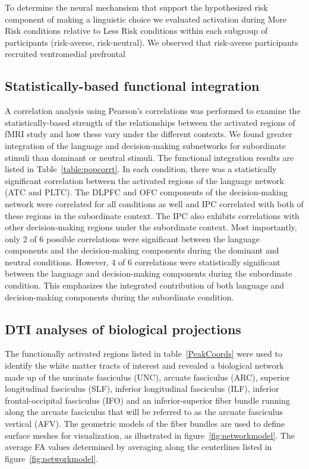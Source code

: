 \documentclass[final,authoryear,5p,times,twocolumn]{elsarticle}
\begin{document}
To determine the neural mechansism that support the hypothesized risk component of making a linguistic choice we evaluated activation during More Risk conditions relative to Less Risk conditions within each subgroup of participants (risk-averse, risk-neutral).  We observed that risk-averse participants recruited ventromedial prefrontal

\subsection{Statistically-based functional integration}
A correlation analysis using Pearson's correlations was performed to examine the statistically-based strength of the relationships between the activated regions of fMRI study and how these vary under the different contexts. We found greater integration of the language and decision-making subnetworks for subordinate stimuli than dominant or neutral stimuli. The functional integration results are listed in Table~\ref{table:popcorrt}. In each condition, there was a statistically significant correlation between the activated regions of the language network (ATC and PLTC). The DLPFC and OFC components of the decision-making network were correlated for all conditions as well and IPC correlated with both of these regions in the subordinate context. The IPC also exhibits correlations with other decision-making regions under the subordinate context. Most importantly, only 2 of 6 possible correlations were significant between the language components and the decision-making components during the dominant and neutral conditions. However, 4 of 6 correlations were statistically significant between the language and decision-making components during the subordinate condition. This emphasizes the integrated contribution of both language and decision-making components during the subordinate condition. 

\subsection{DTI analyses of biological projections}
The functionally activated regions listed in table~\ref{PeakCoords} were used to identify the white matter tracts of interest and revealed a biological network made up of the uncinate fasciculus (UNC), arcuate fasciculus (ARC), superior longitudinal fasciculus (SLF), inferior longitudinal fasciculus (ILF), inferior frontal-occipital fasciculus (IFO) and an inferior-superior fiber bundle running along the arcuate fasciculus that will be referred to as the arcuate fasciculus vertical (AFV). The geometric models of the fiber bundles are used to define surface meshes for visualization, as illustrated in figure~\ref{fig:networkmodel}. The average FA values determined by averaging along the centerlines listed in figure~\ref{fig:networkmodel}. 
\end{document}
